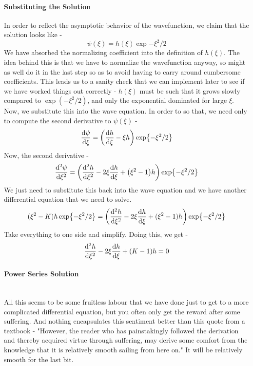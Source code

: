\paragraph{Substituting the Solution}
In order to reflect the asymptotic behavior of the wavefunction, we claim that the solution looks like -
\begin{equation*}
  \psi(\xi)=h(\xi)\exp{-\xi^2/2}
\end{equation*}
We have absorbed the normalizing coefficient into the definition of $h(\xi)$. The idea behind this is that we have to normalize the wavefunction anyway, so might as well do it in the last step so as to avoid having to carry around cumbersome coefficients. This leads us to a sanity check that we can implement later to see if we have worked things out correctly - $h(\xi)$ must be such that it grows slowly compared to $\exp(-\xi^{2}/2)$, and only the exponential dominated for large $\xi$. Now, we substitute this into the wave equation. In order to so that, we need only to compute the second derivative to $\psi(\xi)$ -
\begin{equation*}
  \dv{\psi}{\xi}=\qty(\dv{h}{\xi}-\xi h)\exp{-\xi^2/2}
\end{equation*}
Now, the second derivative -
\begin{equation*}
  \dv[2]{\psi}{\xi}=\qty(\dv[2]{h}{\xi}-2\xi\dv{h}{\xi}+\qty(\xi^2-1)h)\exp{-\xi^2/2}
\end{equation*}
We just need to substitute this back into the wave equation and we have another differential equation that we need to solve.
\begin{equation*}
  (\xi^2-K)h\exp{-\xi^2/2}=\qty(\dv[2]{h}{\xi}-2\xi\dv{h}{\xi}+(\xi^2-1)h)\exp{-\xi^2/2}
\end{equation*}
Take everything to one side and simplify. Doing this, we get -
\begin{equation*}
  \dv[2]{h}{\xi}-2\xi\dv{h}{\xi}+(K-1)h=0
\end{equation*}
\paragraph{Power Series Solution}\,\\
All this seems to be some fruitless labour that we have done just to get to a more complicated differential equation, but you often only get the reward after some suffering. And nothing encapsulates this sentiment better than this quote from a textbook - "However, the reader who has painstakingly followed the derivation and thereby acquired virtue through suffering, may derive some comfort from the knowledge that it is relatively smooth sailing from here on." It will be relatively smooth for the last bit.

